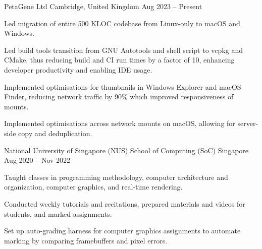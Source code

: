 \begin{cventries}
	{PetaGene Ltd} %
	{Cambridge, United Kingdom} %
	{Aug 2023 -- Present} %
	{
		\begin{cvitems} %
			\item Led migration of entire 500 KLOC codebase from Linux-only to macOS and Windows.
			\item Led build tools transition from GNU Autotools and shell script to vcpkg and CMake, thus reducing build and CI run times by a factor of 10, enhancing developer productivity and enabling IDE usage.
			\item Implemented optimisations for thumbnails in Windows Explorer and macOS Finder, reducing network traffic by 90\% which improved responsiveness of mounts.
			\item Implemented optimisations across network mounts on macOS, allowing for server-side copy and deduplication.
		\end{cvitems}
	}


	{National University of Singapore (NUS) School of Computing (SoC)} %
	{Singapore} %
	{Aug 2020 -- Nov 2022} %
	{
		\begin{cvitems} %
			\item Taught classes in programming methodology, computer architecture and organization, computer graphics, and real-time rendering.
			\item Conducted weekly tutorials and recitations, prepared materials and videos for students, and marked assignments.
			\item Set up auto-grading harness for computer graphics assignments to automate marking by comparing framebuffers and pixel errors.
		\end{cvitems}
	}



\end{cventries}
